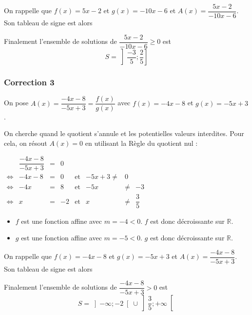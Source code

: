 \documentclass[15pt, mathserif]{beamer}
\begin{document}
\begin{frame}On rappelle que $f(x) = 5x-2$ et $g(x) = -10x-6$ et $A(x) = \dfrac{5x-2}{-10x-6}$. Son tableau de signe est alors 

\medskip \hfil
{}

 Finalement l'ensemble de solutions de $\dfrac{5x-2}{-10x-6}\geq0$ est\[S = \left]\dfrac{-3}{5};\dfrac{2}{5}\right]\]

\end{frame}


\begin{frame}
\vspace{-10mm}
	\frametitle{Correction 3}
\vspace*{1cm} 
  On pose $A(x) = \dfrac{-4x-8}{-5x+3} = \dfrac{f(x)}{g(x)}$ avec $f(x) = -4x-8$ et $g(x) = -5x+3$.

 On cherche quand le quotient s'annule et les potentielles valeurs interdites. Pour cela, on résout $A(x)=0$ en utilisant la Règle du quotient nul : 
 
 $\begin{array}{crclcrcl} 
 
 	  & \dfrac{-4x-8}{-5x+3} & = & 0 \\ 
 	  \Leftrightarrow & -4x-8 & =& 0 & \text{et} & -5x+3\neq & 0 \\ 
 	 \Leftrightarrow & -4x&=&8& \text{et} & -5x & \neq & -3 \\ 
 	 \Leftrightarrow & x&=&-2 & \text{et} & x &\neq&\dfrac{3}{5}
 
 \end{array}$ 
 	 \begin{itemize} 
	\item  $f$ est une fonction affine avec $m =-4<0$. $f$ est donc décroissante sur $\mathbb{R}$.
	\item $g$ est une fonction affine avec $m =-5<0$. $g$ est donc décroissante sur $\mathbb{R}$.

	 \end{itemize}

 \end{frame}


\begin{frame}On rappelle que $f(x) = -4x-8$ et $g(x) = -5x+3$ et $A(x) = \dfrac{-4x-8}{-5x+3}$. Son tableau de signe est alors 

\medskip \hfil
{}

 Finalement l'ensemble de solutions de $\dfrac{-4x-8}{-5x+3}>0$ est\[S = \left]-\infty;-2\right[\cup\left]\dfrac{3}{5};+\infty\right[\]

\end{frame}
\end{document}
